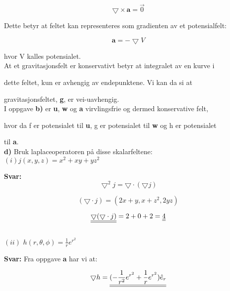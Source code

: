 \documentclass[a4paper,norsk,12pt]{article}
\begin{document}
\begin{equation}
\bigtriangledown \times \textbf{a} = \vec{0}
\end{equation}

Dette betyr at feltet kan representeres som gradienten av et potensialfelt:

\begin{equation}
\textbf{a} = - \bigtriangledown V 
\end{equation}

hvor V kalles potensialet. \\


At et gravitasjonsfelt er konservativt betyr at integralet av en kurve i 

dette feltet, kun er avhengig av endepunktene. Vi kan da si at

gravitasjonsfeltet, \textbf{g}, er vei-uavhengig.\\

I oppgave \textbf{b)} er \textbf{u}, \textbf{w} og \textbf{a} virvlingsfrie og dermed konservative felt, 

hvor da f er potensialet til \textbf{u}, g er potensialet til \textbf{w} og h er potensialet 

til \textbf{a}.\\


\textbf{d)} \hspace{3mm}  Bruk laplaceoperatoren på disse skalarfeltene:\\

$(i) j(x,y,z) = x^2 + xy + yz^2$ 

\textbf{Svar:}\\
$$
\bigtriangledown^2 j = \bigtriangledown \cdot (\bigtriangledown j )
$$

$$
(\bigtriangledown \cdot j) = (2x + y, x + z^2, 2yz)
$$

$$
\def\doubleunderline#1{\underline{\underline{#1}}}
\doubleunderline{\bigtriangledown ( \bigtriangledown \cdot j) }= 2 + 0 + 2 =  \doubleunderline{4}
$$\\


$(ii)$ \hspace{3mm} $h(r,\theta ,\phi) = \frac{1}{r} e^{r^2}  $ \

\textbf{Svar:}
Fra oppgave \textbf{a} har vi at:

$$
\def\doubleunderline#1{\underline{\underline{#1}}}
\bigtriangledown h  = \doubleunderline{(- \frac{1}{r^2} e^{r^2} + \frac{1}{r} e^{r^2} ) \hat e_r}
$$ \\
\end{document}
